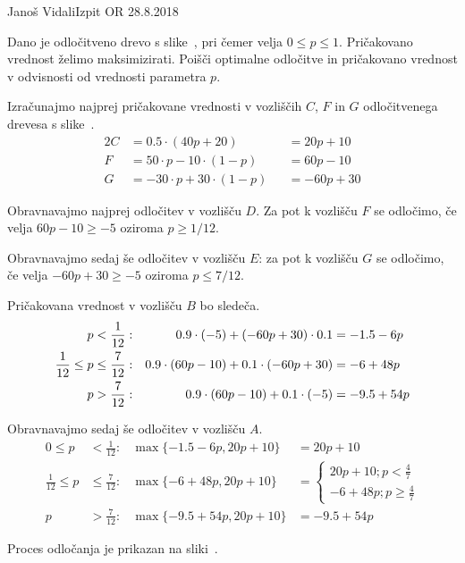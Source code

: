 \begin{naloga}{Janoš Vidali}{Izpit OR 28.8.2018}
\begin{vprasanje}
Dano je odločitveno drevo s slike~\fig,
pri čemer velja $0 \le p \le 1$.
Pričakovano vred\-nost želimo maksimizirati.
Poišči optimalne odločitve in pričakovano vrednost
v odvisnosti od vrednosti parametra $p$.

\begin{slika}
\pgfslika
{}
\end{slika}
\end{vprasanje}

\begin{odgovor}
Izračunajmo najprej pričakovane vrednosti v vozliščih $C$, $F$ in $G$
odločitvenega drevesa s slike~\fig.
\begin{alignat*}{2}
C &= 0.5 \cdot (40 p + 20) &&= 20p + 10 \\
F &= 50 \cdot p - 10 \cdot (1-p) &&= 60 p - 10 \\
G &= - 30 \cdot p + 30 \cdot (1-p) &&=  -60p + 30
\end{alignat*}

Obravnavajmo najprej odločitev v vozlišču $D$.
Za pot k vozlišču $F$ se odločimo,
če velja $60p - 10 \ge -5$ oziroma $p \ge 1/12$.

Obravnavajmo sedaj še odločitev v vozlišču $E$: za pot k vozlišču $G$ se odločimo,
če velja $-60p + 30 \ge -5$ oziroma $p \le 7/12$.

Pričakovana vrednost v vozlišču $B$ bo sledeča.
\begin{align*}
p &< {1 \over 12}: & 0.9 \cdot (-5) + (-60p + 30) \cdot 0.1 &= -1.5 - 6p \\
\frac{1}{12} \leq p &\le \frac{7}{12}: &
0.9 \cdot (60p - 10) + 0.1 \cdot (-60p + 30) &= -6 + 48p \\
p &> \frac{7}{12}: & 0.9 \cdot (60p - 10) + 0.1 \cdot (-5) &= -9.5 + 54 p
\end{align*}

Obravnavajmo sedaj še odločitev v vozlišču $A$.
\begin{align*}
0 \leq p &< \frac{1}{12}: & \max \{ -1.5 - 6p, 20p + 10 \} &= 20p + 10 \\
\frac{1}{12} \leq p &\le \frac{7}{12} : & \max \{ -6 + 48p, 20p + 10 \} &= 
\begin{cases}
20p + 10;  p < \frac{4}{7} \\
-6 + 48p;  p \ge \frac{4}{7}
\end{cases} \\
p &> \frac{7}{12} : & \max \{ -9.5 + 54p, 20p + 10 \} &= -9.5 + 54p 
\end{align*}

Proces odločanja je prikazan na sliki~.

\begin{slika}
\end{slika}


\end{odgovor}
\end{naloga}
